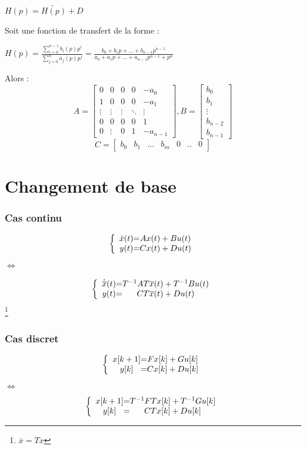{{\begin{itemize}
        $H(p) = \tilde{H(p)} + D$ \newline
\end{itemize}
Soit une fonction de transfert de la forme : \newline
\begin{center}
    \LARGE{$
    H(p) = \frac{\sum_{i=0}^{n-1} b_{i}(p)p^{i}}{\sum_{j=0}^{n} a_{j}(p)p^{j}} =
            \frac{b_{0} + b_{1}p + ... + b_{n-1}p^{n-1}}{a_{0} + a_{1}p + ... + a_{n-1}p^{n-1} + p^{n}}
    $}
\end{center}
Alors : \newline
\[A = 
\begin{bmatrix}
    0 & 0 & 0 & 0 & -a_{0} \\
    1 & 0 & 0 & 0  & -a_{1} \\
    \vdots & \vdots & \vdots & \ddots & \vdots \\
    0 & 0 & 0 & 0 & 1 \\
    0 & \vdots & 0 & 1 & -a_{n-1}
\end{bmatrix}
,B = 
\begin{bmatrix}
    b_{0} \\
    b_{1} \\
    \vdots \\
    b_{n-2} \\
    b_{n-1}
\end{bmatrix}
\]    
\[C = 
\begin{bmatrix}
    b_{0} & b_{1} & ... & b_{m} & 0 & .. & 0
\end{bmatrix}
\] 
\newpage
\section{Changement de base}
\subsubsection{Cas continu}
\LARGE{
    \[
\left \{
\begin{array}{c @{=} c}
    \dot x(t) & Ax(t) + Bu(t)\\
    y(t) & Cx(t) + Du(t)
\end{array}
\right.
\]
$\Longleftrightarrow$
\Large{
    \[
\left \{
\begin{array}{c @{=} c}
    \dot{\overline{x}}(t) & T^{-1}AT\overline{x}(t) + T^{-1}Bu(t) \\
    y(t) & CT\overline{x}(t) + Du(t)
\end{array}
\right.
\]
\footnote{$\overline{x} = Tx$}
\subsubsection{Cas discret}
\LARGE{
    \[
\left \{
\begin{array}{c @{=} c}
    x[k+1] & Fx[k] + Gu[k]\\
    y[k] & Cx[k] + Du[k]
\end{array}
\right.
\]
$\Longleftrightarrow$
\LARGE{
    \[
\left \{
\begin{array}{c @{=} c}
    x[k+1] & T^{-1}FTx[k] + T^{-1}Gu[k]\\
    y[k] & CTx[k] + Du[k]
\end{array}
\right.
\]
\newpage
}}}}}}
